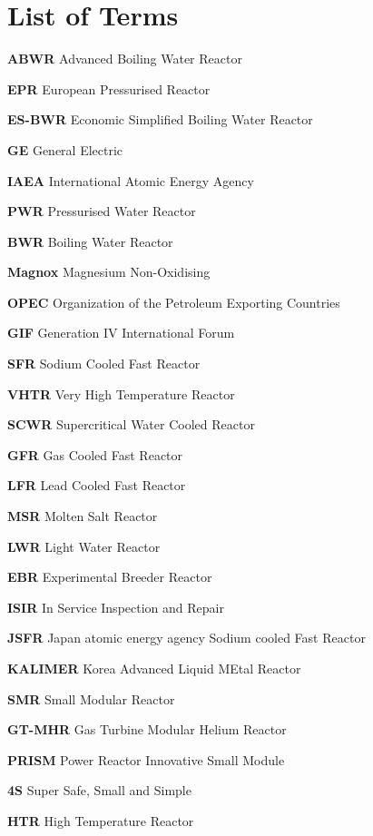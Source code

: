 \documentclass[journal]{IEEEtran}
\begin{document}



\appendices
\section{List of Terms}
\footnotesize
\scriptsize
\textbf{ABWR}  Advanced Boiling Water Reactor   

\textbf{EPR}  European Pressurised Reactor  

\textbf{ES-BWR}  Economic Simplified Boiling Water Reactor  

\textbf{GE}  General Electric  

\textbf{IAEA}  International Atomic Energy Agency  

\textbf{PWR}  Pressurised Water Reactor  

\textbf{BWR}  Boiling Water Reactor  

\textbf{Magnox}  Magnesium Non-Oxidising  

\textbf{OPEC}  Organization of the Petroleum Exporting Countries  

\textbf{GIF}  Generation IV International Forum  

\textbf{SFR}  Sodium Cooled Fast Reactor   

\textbf{VHTR}  Very High Temperature Reactor   

\textbf{SCWR}  Supercritical Water Cooled Reactor   

\textbf{GFR}  Gas Cooled Fast Reactor   

\textbf{LFR}   Lead Cooled Fast Reactor   

\textbf{MSR}   Molten Salt Reactor   

\textbf{LWR}   Light Water Reactor  

\textbf{EBR}  Experimental Breeder Reactor  

\textbf{ISIR}  In Service Inspection and Repair  

\textbf{JSFR}  Japan atomic energy agency Sodium cooled Fast Reactor  

\textbf{KALIMER}  Korea Advanced Liquid MEtal Reactor  

\textbf{SMR}  Small Modular Reactor  

\textbf{GT-MHR}  Gas Turbine Modular Helium Reactor  

\textbf{PRISM}  Power Reactor Innovative Small Module  

\textbf{4S}  Super Safe, Small and Simple  

\textbf{HTR}  High Temperature Reactor  
\end{document}
